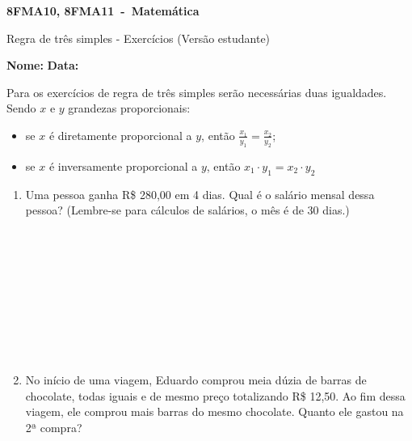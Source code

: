 \documentclass[a4paper,14pt]{article}
\begin{document}
	
	\noindent\textbf{8FMA10, 8FMA11~-~Matemática} 
	
	\begin{center}Regra de três simples - Exercícios (Versão estudante)
	\end{center}
	
	
	\noindent\textbf{Nome:} \underline{\hspace{10cm}}
	\noindent\textbf{Data:} \underline{\hspace{4cm}}
	
	\begin{multicols}{2}
		Para os exercícios de regra de três simples serão necessárias duas igualdades. Sendo $x$ e $y$ grandezas proporcionais:
		\begin{itemize}
			\item se $x$ é diretamente proporcional a $y$, então $\frac{x_1}{y_1} = \frac{x_2}{y_2}$;
			\item se $x$ é inversamente proporcional a $y$, então $x_1 \cdot y_1 = x_2 \cdot y_2$
		\end{itemize} 
		\begin{enumerate}
	    	\item Uma pessoa ganha R\$ 280,00 em 4 dias. Qual é o salário mensal dessa pessoa? (Lembre-se para cálculos de salários, o mês é de 30 dias.) \\\\\\\\\\\\\\\\\\\\
	    	\item No início de uma viagem, Eduardo comprou meia dúzia de barras de chocolate, todas iguais e de mesmo preço totalizando R\$ 12,50. Ao fim dessa viagem, ele comprou mais barras do mesmo chocolate. Quanto ele gastou na 2ª compra? \\\\\\\\\\\\\\\\\\\\

\end{enumerate}
\end{multicols}
\end{document}
